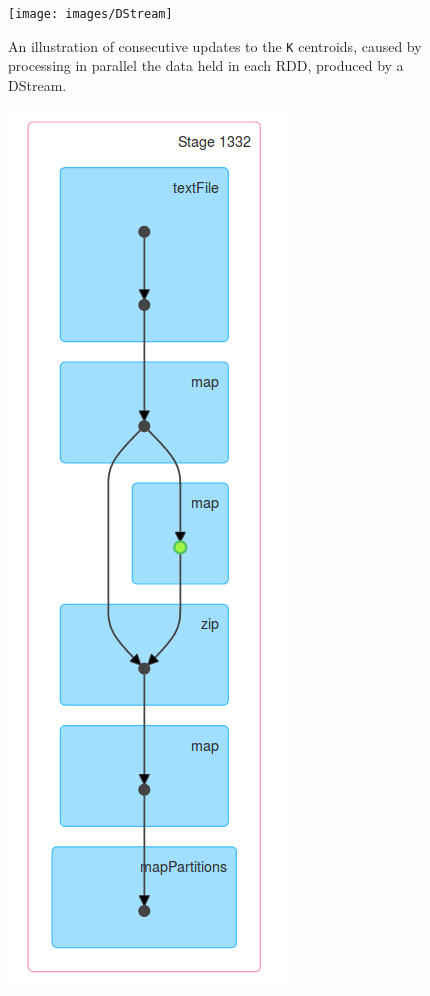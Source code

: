 \documentclass{l4proj}
\begin{document}
\begin{figure}[H]
	\centering
    \label{DStream}
    \texttt{[image: images/DStream]}
    \caption{An illustration of consecutive updates to the \texttt{K} centroids, caused by processing in parallel the data held in each RDD, produced by a DStream.} 
\end{figure}

\begin{figure}[H]
\centering
\begin{minipage}{.45\textwidth}
  \includegraphics[width=1.0\linewidth]{images/DAG5}

\end{minipage}
\end{figure}
\end{document}
